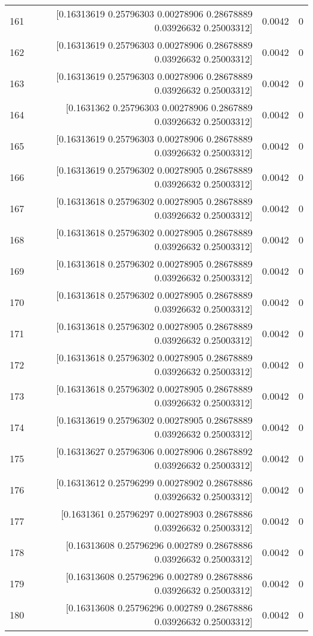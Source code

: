 \begin{longtable}{lrrr}
161 & [0.16313619 0.25796303 0.00278906 0.28678889 0.03926632 0.25003312] & 0.0042 & 0 \\
162 & [0.16313619 0.25796303 0.00278906 0.28678889 0.03926632 0.25003312] & 0.0042 & 0 \\
163 & [0.16313619 0.25796303 0.00278906 0.28678889 0.03926632 0.25003312] & 0.0042 & 0 \\
164 & [0.1631362  0.25796303 0.00278906 0.2867889  0.03926632 0.25003312] & 0.0042 & 0 \\
165 & [0.16313619 0.25796303 0.00278906 0.28678889 0.03926632 0.25003312] & 0.0042 & 0 \\
166 & [0.16313619 0.25796302 0.00278905 0.28678889 0.03926632 0.25003312] & 0.0042 & 0 \\
167 & [0.16313618 0.25796302 0.00278905 0.28678889 0.03926632 0.25003312] & 0.0042 & 0 \\
168 & [0.16313618 0.25796302 0.00278905 0.28678889 0.03926632 0.25003312] & 0.0042 & 0 \\
169 & [0.16313618 0.25796302 0.00278905 0.28678889 0.03926632 0.25003312] & 0.0042 & 0 \\
170 & [0.16313618 0.25796302 0.00278905 0.28678889 0.03926632 0.25003312] & 0.0042 & 0 \\
171 & [0.16313618 0.25796302 0.00278905 0.28678889 0.03926632 0.25003312] & 0.0042 & 0 \\
172 & [0.16313618 0.25796302 0.00278905 0.28678889 0.03926632 0.25003312] & 0.0042 & 0 \\
173 & [0.16313618 0.25796302 0.00278905 0.28678889 0.03926632 0.25003312] & 0.0042 & 0 \\
174 & [0.16313619 0.25796302 0.00278905 0.28678889 0.03926632 0.25003312] & 0.0042 & 0 \\
175 & [0.16313627 0.25796306 0.00278906 0.28678892 0.03926632 0.25003312] & 0.0042 & 0 \\
176 & [0.16313612 0.25796299 0.00278902 0.28678886 0.03926632 0.25003312] & 0.0042 & 0 \\
177 & [0.1631361  0.25796297 0.00278903 0.28678886 0.03926632 0.25003312] & 0.0042 & 0 \\
178 & [0.16313608 0.25796296 0.002789   0.28678886 0.03926632 0.25003312] & 0.0042 & 0 \\
179 & [0.16313608 0.25796296 0.002789   0.28678886 0.03926632 0.25003312] & 0.0042 & 0 \\
180 & [0.16313608 0.25796296 0.002789   0.28678886 0.03926632 0.25003312] & 0.0042 & 0 \\

\end{longtable}
